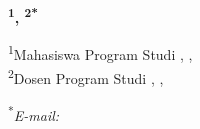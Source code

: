 \documentclass[a4paper, 12pt]{article}
\begin{document}
    
    \pagestyle{fancy}
    
    \begin{center}
        \textbf{\large\judul}
        
        \textbf{\namaMahasiswa\textsuperscript{1}, \namaDosen\textsuperscript{2*}}
        
        \textsuperscript{1}Mahasiswa Program Studi \programStudi, \fakultas, \perguruanTinggi
        \\
        \textsuperscript{2}Dosen Program Studi \programStudiDosen, \fakultasDosen, \perguruanTinggiDosen
        
        \textsuperscript{*}\textit{E-mail: \emailref{\emailDosen}}
        
%       
%        

%        
%        
    \end{center}
    
    
    
    \onehalfspacing %
    
    
    
    
    
    
    \nocite{*}
    
    
\end{document}
